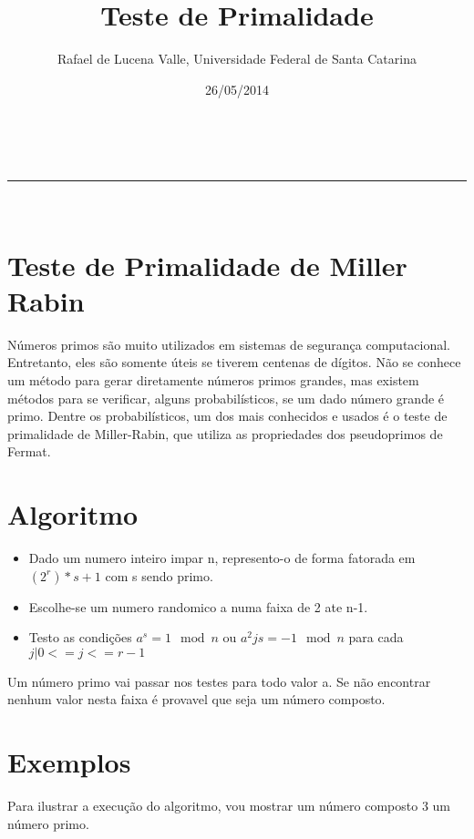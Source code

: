 \documentclass[a4paper,11pt]{article}
\makeatletter
\newcommand{\linia}{\rule{\linewidth}{0.5pt}}
\theoremstyle{mytheor}
\renewcommand{\maketitle}{
\begin{center}
\vspace{2ex}
{\huge \textsc{\@title}}
\vspace{1ex}
\\
\linia\\
\@author \hfill \@date
\vspace{4ex}
\end{center}
}
\makeatother
\begin{document}
\title{Teste de Primalidade}

\author{Rafael de Lucena Valle, Universidade Federal de Santa Catarina}

\date{26/05/2014}

\maketitle

\section*{Teste de Primalidade de Miller Rabin}
Números primos são muito utilizados em sistemas de segurança computacional. Entretanto, eles são somente úteis se tiverem centenas de dígitos. Não se conhece um método para gerar diretamente números primos grandes, mas existem métodos para se verificar, alguns probabilísticos, se um dado número grande é primo.
Dentre os probabilísticos, um dos mais conhecidos e usados é o teste de primalidade de Miller-Rabin, que utiliza as propriedades dos pseudoprimos de Fermat.


\section*{Algoritmo}
\begin{itemize}
    \item Dado um numero inteiro impar n, represento-o de forma fatorada em $(2^r)*s + 1$ com s sendo primo.
    \item Escolhe-se um numero randomico a numa faixa de 2 ate n-1.
    \item Testo as condições $a^s = 1 \mod n$ ou $a^2js = -1 \mod n$ para cada $j | 0 <= j <= r-1$
\end{itemize}
Um número primo vai passar nos testes para todo valor a. Se não encontrar nenhum valor nesta faixa é provavel que seja um número composto.

\section*{Exemplos}

Para ilustrar a execução do algoritmo, vou mostrar um número composto 3 um número primo.
\end{document}
